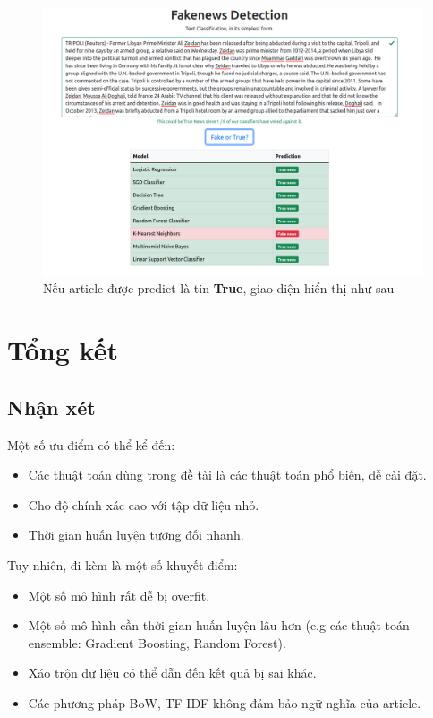 \documentclass[12pt]{article}
\begin{document}
\begin{figure}[H]
\centering
\includegraphics[scale=.25]{img/true-result.png}
\caption{Nếu article được predict là tin \textbf{True}, giao diện hiển thị như sau}
\label{fig:true-result}
\end{figure}

\section{Tổng kết}
\subsection{Nhận xét}
Một số ưu điểm có thể kể đến:
\begin{itemize}
\item Các thuật toán dùng trong đề tài là các thuật toán phổ biến, dễ cài đặt.
\item Cho độ chính xác cao với tập dữ liệu nhỏ.
\item Thời gian huấn luyện tương đối nhanh.
\end{itemize}
Tuy nhiên, đi kèm là một số khuyết điểm:
\begin{itemize}
\item Một số mô hình rất dễ bị overfit.
\item Một số mô hình cần thời gian huấn luyện lâu hơn (e.g các thuật toán ensemble: Gradient Boosting, Random Forest).
\item Xáo trộn dữ liệu có thể dẫn đến kết quả bị sai khác.\cite{Kowsari_2019}
\item Các phương pháp BoW, TF-IDF không đảm bảo ngữ nghĩa của article.
\end{itemize}
\end{document}
